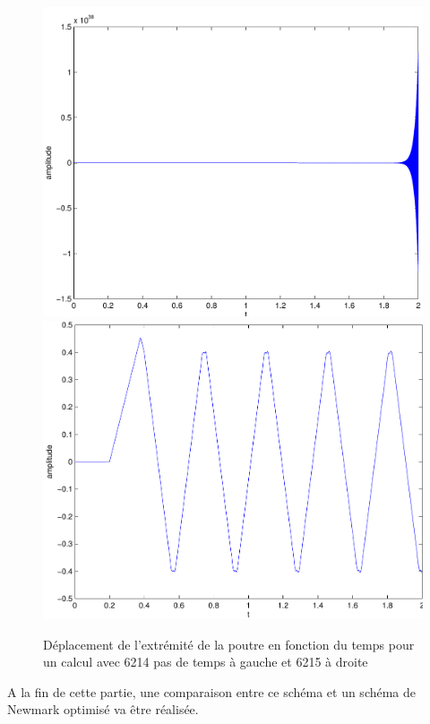 \documentclass[]{article}
\begin{document}
\begin{figure}
\begin{center}
 \includegraphics[scale=0.42]{Figures/depldifcendiv.pdf}
\includegraphics[scale=0.42]{Figures/depldifcenconv.pdf}
\caption{Déplacement de l'extrémité de la poutre en fonction du temps pour un
calcul avec 6214 pas de temps à gauche et 6215 à droite}
\label{convdiv}
\end{center}
\end{figure}
A la fin de cette partie, une comparaison entre ce schéma et un schéma de
Newmark optimisé va être réalisée.
\end{document}

